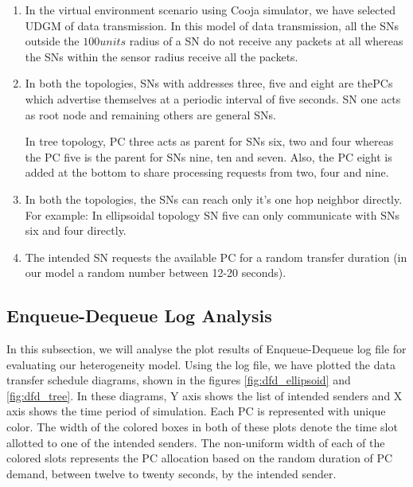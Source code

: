         \begin{enumerate}
            \item In the virtual environment scenario using Cooja simulator, we have selected \ac{UDGM} of data transmission. In this model of data transmission, all the \acp{SN} outside the $100units$ radius of a \ac{SN} do not receive any packets at all whereas the \acp{SN} within the sensor radius receive all the packets.
            
            \item In both the topologies, \acp{SN} with addresses three, five and eight are the\acp{PC} which advertise themselves at a periodic  interval of five seconds. \ac{SN} one acts as root node and remaining others are general \acp{SN}.
            \par
            In tree topology, \ac{PC} three acts as parent for \acp{SN} six, two and four whereas the \ac{PC} five is the parent for \acp{SN} nine, ten and seven. Also, the \ac{PC} eight is added at the bottom to share processing requests from two, four and nine.
            
            \item In both the topologies, the \acp{SN} can reach only it's one hop neighbor directly. For example: In ellipsoidal topology \ac{SN} five can only communicate with \acp{SN} six and four directly. 
        
            \item The intended \ac{SN} requests the available \ac{PC} for a random transfer duration (in our model a random number between 12-20 seconds).
        \end{enumerate}
            
    \subsection*{Enqueue-Dequeue Log Analysis}
    
    In this subsection, we will analyse the plot results of Enqueue-Dequeue log file for evaluating our heterogeneity model. Using the log file, we have plotted the data transfer schedule diagrams, shown in the figures \ref{fig:dfd_ellipsoid} and \ref{fig:dfd_tree}. In these diagrams, Y axis shows the list of intended senders and X axis shows the time period of simulation. Each \ac{PC} is represented with unique color. The width of the colored boxes in both of these plots denote the time slot allotted to one of the intended senders. The non-uniform width of each of the colored slots represents the \ac{PC} allocation based on the random duration of \ac{PC} demand, between twelve to twenty seconds, by the intended sender.
    
